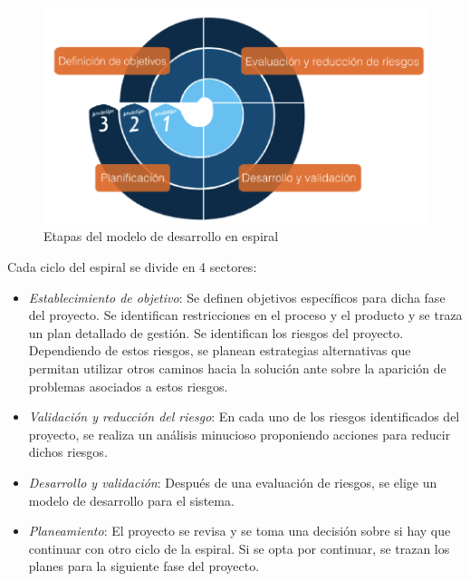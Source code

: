 \begin{figure}[h!]
 \begin{center}
  \includegraphics[width=1\textwidth,keepaspectratio=true]{./images/ESPIRAL}
  \caption{Etapas del modelo de desarrollo en espiral}
  \label{fig:esquema}
 \end{center}
\end{figure}

Cada ciclo del espiral se divide en 4 sectores:
\begin {itemize}
\item 
\textit{Establecimiento de objetivo}: Se definen objetivos específicos para dicha fase del proyecto. Se identifican restricciones en el proceso y el
producto y se traza un plan detallado de gestión. Se identifican los riesgos del proyecto. Dependiendo de estos riesgos, se planean estrategias
alternativas que permitan utilizar otros caminos hacia la solución ante sobre la aparición de problemas asociados a estos riesgos.
\item 
\textit{Validación y reducción del riesgo}: En cada uno de los riesgos identificados del proyecto, se realiza un análisis minucioso proponiendo
acciones para reducir dichos riesgos.
\item 
\textit{Desarrollo y validación}: Después de una evaluación de riesgos, se elige un modelo de desarrollo para el sistema.
\item 
\textit{Planeamiento}: El proyecto se revisa y se toma una decisión sobre si hay que continuar con otro ciclo de la espiral. Si se opta por continuar,
se trazan los planes para la siguiente fase del proyecto.
\end {itemize}

